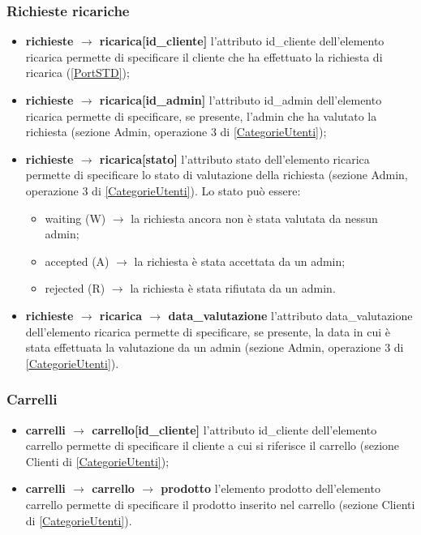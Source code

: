 \documentclass[a4paper, 14pt]{article}
\begin{document}
\begin{flushleft}
			\subsubsection{Richieste ricariche} 
			\begin{itemize}
				\item \textbf{richieste $\rightarrow$ ricarica[id\_cliente] } l'attributo id\_cliente dell'elemento ricarica permette di specificare il cliente che ha effettuato la richiesta di ricarica (\ref{PortSTD});
				\item \textbf{richieste $\rightarrow$ ricarica[id\_admin] } l'attributo id\_admin dell'elemento ricarica permette di specificare, se presente, l'admin che ha valutato la richiesta (sezione Admin, operazione 3 di \ref{CategorieUtenti});
				\item \textbf{richieste $\rightarrow$ ricarica[stato] } l'attributo stato dell'elemento ricarica permette di specificare lo stato di valutazione della richiesta 
				(sezione Admin, operazione 3 di \ref{CategorieUtenti}). Lo stato può essere:
				\begin{itemize}
					\item waiting (W) $\rightarrow$ la richiesta ancora non è stata valutata da nessun admin;
					\item accepted (A) $\rightarrow$ la richiesta è stata accettata da un admin;
					\item rejected (R) $\rightarrow$ la richiesta è stata rifiutata da un admin.
				\end{itemize}
				\item \textbf{richieste $\rightarrow$ ricarica $\rightarrow$ data\_valutazione } l'attributo data\_valutazione dell'elemento ricarica permette di specificare, se presente, la data in cui è stata effettuata la valutazione da un admin (sezione Admin, operazione 3 di \ref{CategorieUtenti}).
			\end{itemize}
			
			\subsubsection{Carrelli} 
			\begin{itemize}
				\item \textbf{carrelli $\rightarrow$ carrello[id\_cliente] } l'attributo id\_cliente dell'elemento carrello permette di specificare il cliente a cui si riferisce il carrello (sezione Clienti di \ref{CategorieUtenti});
				\item \textbf{carrelli $\rightarrow$ carrello $\rightarrow$ prodotto} l'elemento prodotto dell'elemento carrello permette di specificare il prodotto inserito nel carrello (sezione Clienti di \ref{CategorieUtenti}).
			\end{itemize}
		\newpage
		

\end{flushleft}
\end{document}
